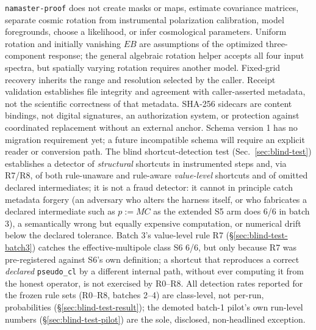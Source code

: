 \documentclass[11pt]{article}
\newcommand{\software}{\texttt{namaster-proof}}
\begin{document}
\software{} does not create masks or maps, estimate covariance matrices,
separate cosmic rotation from instrumental polarization calibration, model
foregrounds, choose a likelihood, or infer cosmological parameters.  Uniform
rotation and initially vanishing \(EB\) are assumptions of the optimized
three-component response; the general algebraic rotation helper accepts all
four input spectra, but spatially varying rotation requires another model.
Fixed-grid recovery inherits the range and resolution selected by the caller.
Receipt validation establishes file integrity and agreement with caller-asserted
metadata, not the scientific correctness of that metadata. SHA-256 sidecars
are content bindings, not digital signatures, an authorization system, or
protection against coordinated replacement without an external anchor.
Schema version 1 has no migration requirement yet; a future incompatible
schema will require an explicit reader or conversion path. The blind
shortcut-detection test (Sec.~\ref{sec:blind-test}) establishes a detector of
\emph{structural} shortcuts in instrumented steps and, via R7/R8, of both
rule-unaware and rule-aware \emph{value-level} shortcuts and of omitted
declared intermediates; it is not a fraud detector: it cannot in principle
catch metadata forgery (an adversary who
alters the harness itself, or who fabricates a declared intermediate such as
\(p:=MC\) as the extended S5 arm does 6/6 in batch 3), a semantically wrong
but equally expensive computation, or numerical drift below the declared
tolerance. Batch 3's value-level rule R7
(\S\ref{sec:blind-test-batch3}) catches the effective-multipole class S6
6/6, but only because R7 was pre-registered against S6's own definition; a
shortcut that reproduces a correct \emph{declared} \texttt{pseudo\_cl}
by a different internal path, without ever computing it from the honest
operator, is not exercised by R0--R8. All detection rates reported for the
frozen rule sets (R0--R8, batches 2--4) are class-level, not per-run,
probabilities (\S\ref{sec:blind-test-result}); the demoted batch-1 pilot's
own run-level numbers (\S\ref{sec:blind-test-pilot}) are the sole,
disclosed, non-headlined exception.
\end{document}
